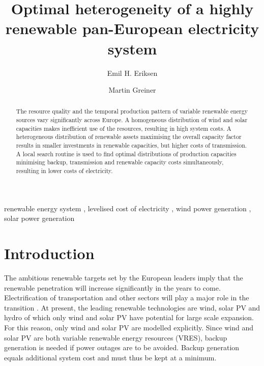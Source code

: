 \documentclass[a4paper, 5p, sort&compress]{elsarticle}%
\begin{document}
\begin{frontmatter}

\title{Optimal heterogeneity of a highly renewable pan-European electricity system}

\author[label1]{Emil H. Eriksen}
\author[label2,label3]{Martin Greiner}
\address[label1]{Department of Physics and Astronomy, Aarhus University, 8000 Aarhus C,  Denmark}
\address[label2]{Department of Mathematics, Aarhus University, 8000 Aarhus C,  Denmark}
\address[label3]{Department of Engineering, Aarhus University, 8200 Aarhus,  Denmark}


\begin{abstract}
  The resource quality and the temporal production pattern of variable
  renewable energy sources vary significantly across Europe. A
  homogeneous distribution of wind and solar capacities makes
  inefficient use of the resources, resulting in high system costs. A
  heterogeneous distribution of renewable assets maximising the
  overall capacity factor results in smaller investments in renewable
  capacities, but higher costs of transmission. A local search routine
  is used to find optimal distributions of production capacities
  minimising backup, transmission and renewable capacity costs
  simultaneously, resulting in lower costs of electricity.
\end{abstract}

\begin{keyword}
renewable energy system \sep 
levelised cost of electricity \sep
wind power generation \sep
solar power generation 
\end{keyword}

\end{frontmatter}


\section{Introduction}
\label{sec:one}

The ambitious renewable targets set by the European leaders
\cite{eu2050} imply that the renewable penetration will increase
significantly in the years to come. Electrification of transportation
and other sectors will play a major role in the transition
\cite{Williams12,ecf2050}. At present, the leading renewable
technologies are wind, solar PV and hydro of which only wind and
solar PV have potential for large scale expansion. For this reason,
only wind and solar PV are modelled explicitly. Since wind and
solar PV are both variable renewable energy resources (VRES), backup
generation is needed if power outages are to be avoided. Backup
generation equals additional system cost and must thus be kept at a
minimum.
\end{document}

